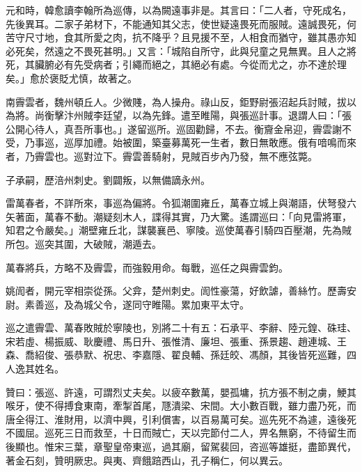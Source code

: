\begin{pinyinscope}
 元和時，韓愈讀李翰所為巡傳，以為闕遠事非是。其言曰：「二人者，守死成名，先後異耳。二家子弟材下，不能通知其父志，使世疑遠畏死而服賊。遠誠畏死，何苦守尺寸地，食其所愛之肉，抗不降乎？且見援不至，人相食而猶守，雖其愚亦知必死矣，然遠之不畏死甚明。」又言：「城陷自所守，此與兒童之見無異。且人之將死，其臟腑必有先受病者；引繩而絕之，其絕必有處。今從而尤之，亦不達於理矣。」愈於褒貶尤慎，故著之。



 南霽雲者，魏州頓丘人。少微賤，為人操舟。祿山反，鉅野尉張沼起兵討賊，拔以為將。尚衡擊汴州賊李廷望，以為先鋒。遣至睢陽，與張巡計事。退謂人曰：「張公開心待人，真吾所事也。」遂留巡所。巡固勸歸，不去。衡齎金帛迎，霽雲謝不受，乃事巡，巡厚加禮。始被圍，築臺募萬死一生者，數日無敢應。俄有喑鳴而來者，乃霽雲也。巡對泣下。霽雲善騎射，見賊百步內乃發，無不應弦斃。



 子承嗣，歷涪州刺史。劉闢叛，以無備謫永州。



 雷萬春者，不詳所來，事巡為偏將。令狐潮圍雍丘，萬春立城上與潮語，伏弩發六矢著面，萬春不動。潮疑刻木人，諜得其實，乃大驚。遙謂巡曰：「向見雷將軍，知君之令嚴矣。」潮壁雍丘北，謀襲襄邑、寧陵。巡使萬春引騎四百壓潮，先為賊所包。巡突其圍，大破賊，潮遁去。



 萬春將兵，方略不及霽雲，而強毅用命。每戰，巡任之與霽雲鈞。



 姚訚者，開元宰相崇從孫。父弇，楚州刺史。訚性豪蕩，好飲謔，善絲竹。歷壽安尉。素善巡，及為城父令，遂同守睢陽。累加東平太守。



 巡之遣霽雲、萬春敗賊於寧陵也，別將二十有五：石承平、李辭、陸元鍠、硃珪、宋若虛、楊振威、耿慶禮、馬日升、張惟清、廉坦、張重、孫景趨、趙連城、王森、喬紹俊、張恭默、祝忠、李嘉隱、翟良輔、孫廷皎、馮顏，其後皆死巡難，四人逸其姓名。



 贊曰：張巡、許遠，可謂烈丈夫矣。以疲卒數萬，嬰孤墉，抗方張不制之虜，鯁其喉牙，使不得搏食東南，牽掣首尾，豗潰梁、宋間。大小數百戰，雖力盡乃死，而唐全得江、淮財用，以濟中興，引利償害，以百易萬可矣。巡先死不為遽，遠後死不國屈。巡死三日而救至，十日而賊亡，天以完節付二人，畀名無窮，不待留生而後顯也。惟宋三葉，章聖皇帝東巡，過其廟，留駕裴回，咨巡等雄挺，盡節異代，著金石刻，贊明厥忠。與夷、齊餓踣西山，孔子稱仁，何以異云。



\end{pinyinscope}
